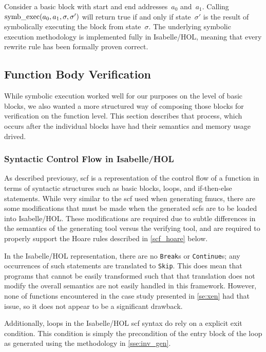Consider a basic block with start and end addresses~$a_0$ and~$a_1$.
Calling $\operatorname{symb\_exec}(a_0,a_1,\sigma,\sigma')$ will return true
if and only if state~$\sigma'$ is the result of
symbolically executing the block from state~$\sigma$.
The underlying symbolic execution methodology
is implemented fully in Isabelle/HOL,
meaning that every rewrite rule has been formally proven correct.
\begin{example}
\end{example}

\subsection{Function Body Verification}
While symbolic execution worked well for our purposes on the level of basic blocks,
we also wanted a more structured way of composing those blocks
for verification on the function level. This section describes that process,
which occurs after the individual blocks have had their semantics
and memory usage drived.

\subsubsection{Syntactic Control Flow in Isabelle/HOL}\label{isabelle_scf}
As described previousy, \acl{scf} is a representation of the control flow of a function
in terms of syntactic structures such as basic blocks,
loops, and if-then-else statements.
While very similar to the \ac{scf} used when generating \acp{fmuc},
there are some modifications that must be made when the generated \acp{scf}
are to be loaded into Isabelle/HOL.
These modifications are required due to subtle differences in the semantics
of the generating tool versus the verifying tool,
and are required to properly support the Hoare rules
described in \cref{scf_hoare} below.

In the Isabelle/HOL representation,
there are no \texttt{Break}s or \texttt{Continue}s;
any occurrences of such statements are translated to \texttt{Skip}.
This does mean that programs that cannot be easily transformed
such that that translation does not modify the overall semantics
are not easily handled in this framework.
However, none of functions encountered in the case study presented in \cref{se:xen}
had that issue, so it does not appear to be a significant drawback.

Additionally, loops in the Isabelle/HOL \ac{scf} syntax
do rely on a explicit exit condition.
This condition is simply the precondition of the entry block of the loop
as generated using the methodology in \cref{sse:inv_gen}.

